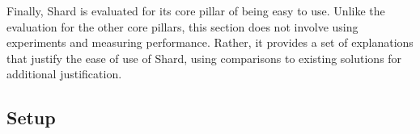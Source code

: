 \documentclass[twoside]{report}
\begin{document}

Finally, Shard is evaluated for its core pillar of being easy to use.
Unlike the evaluation for the other core pillars, this section does not involve using experiments and measuring performance.
Rather, it provides a set of explanations that justify the ease of use of Shard, using comparisons to existing solutions for additional justification.

\subsection{Setup}
\end{document}
